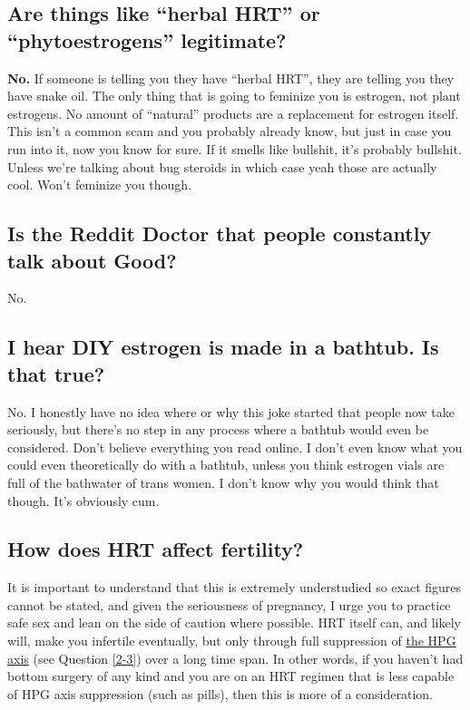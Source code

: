 \documentclass{article}
\begin{document}
\subsection{Are things like “herbal HRT” or “phytoestrogens” legitimate?}

\textbf{No.} If someone is telling you they have “herbal HRT”, they are telling you they have snake oil. The only thing that is going to feminize you is estrogen, not plant estrogens. No amount of “natural” products are a replacement for estrogen itself. This isn’t a common scam and you probably already know, but just in case you run into it, now you know for sure. If it smells like bullshit, it’s probably bullshit. Unless we’re talking about bug steroids in which case yeah those are actually cool. Won’t feminize you though.

\subsection{Is the Reddit Doctor that people constantly talk about Good?}

No.

\subsection{I hear DIY estrogen is made in a bathtub. Is that true?}

No. I honestly have no idea where or why this joke started that people now take seriously, but there’s no step in any process where a bathtub would even be considered. Don’t believe everything you read online. I don’t even know what you could even theoretically do with a bathtub, unless you think estrogen vials are full of the bathwater of trans women. I don’t know why you would think that though. It’s obviously cum.

\subsection{How does HRT affect fertility?}\label{11-42}

It is important to understand that this is extremely understudied so exact figures cannot be stated, and given the seriousness of pregnancy, I urge you to practice safe sex and lean on the side of caution where possible. HRT itself can, and likely will, make you infertile eventually, but only through full suppression of \href{https://en.wikipedia.org/wiki/Hypothalamic-pituitary-gonadal_axis}{the HPG axis} (see Question \ref{2-3}) over a long time span. In other words, if you haven't had bottom surgery of any kind and you are on an HRT regimen that is less capable of HPG axis suppression (such as pills), then this is more of a consideration.
\end{document}
